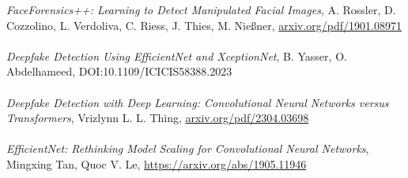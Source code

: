 \documentclass[conference]{IEEEtran}
\begin{document}
\textit{FaceForensics++: Learning to Detect Manipulated Facial Images}, A. Rossler, D. Cozzolino, L. Verdoliva, C. Riess, J. Thies, M. Nießner, \href{https://arxiv.org/pdf/1901.08971}{arxiv.org/pdf/1901.08971} \\ \\
\textit{Deepfake Detection Using EfficientNet and XceptionNet}, B. Yasser, O. Abdelhameed, DOI:10.1109/ICICIS58388.2023 \\ \\
\textit{Deepfake Detection with Deep Learning: Convolutional Neural Networks versus Transformers}, Vrizlynn L. L. Thing, \href{https://arxiv.org/pdf/2304.03698}{arxiv.org/pdf/2304.03698} \\ \\
\textit{EfficientNet: Rethinking Model Scaling for Convolutional Neural Networks}, Mingxing Tan, Quoc V. Le, \href{arxiv.org/pdf/1905.11946}{https://arxiv.org/abs/1905.11946} \\ \\
\end{document}

